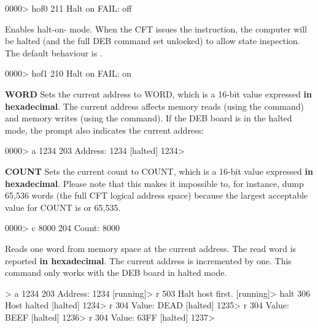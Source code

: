 \begin{description}
\begin{debcode}
[halted] 0000> hof0
211 Halt on FAIL: off
\end{debcode}


\item{\bfseries{}} Enables halt-on- mode. When the CFT
  issues the  instruction, the computer will be halted (and
  the full \gls{DEB} command set unlocked) to allow state
  inspection. The default behaviour is .

\begin{debcode}
[halted] 0000> hof1
210 Halt on FAIL: on
\end{debcode}


\item{\bfseries{} WORD} Sets the current address to WORD, which is a
  16-bit value expressed {\bfseries in hexadecimal}. The current address
  affects memory reads (using the  command) and memory writes
  (using the  command). If the \gls{DEB} board is in the
  halted mode, the prompt also indicates the current address:

\begin{debcode}
[halted] 0000> a 1234
203 Address: 1234
[halted] 1234> 
\end{debcode}


\item{\bfseries{} COUNT} Sets the current count to COUNT, which is a
  16-bit value expressed {\bfseries in hexadecimal}. Please note that this
  makes it impossible to, for instance, dump 65,536 words (the full
  CFT logical address space) because the largest acceptable value for
  COUNT is  or 65,535.

\begin{debcode}
[halted] 0000> c 8000
204 Count: 8000
\end{debcode}


\item{\bfseries{}} Reads one word from memory space at the current
  address. The read word is reported {\bfseries in hexadecimal}. The current
  address is incremented by one. This command only works with the
  \gls{DEB} board in halted mode.

\begin{debcode}
[running]> a 1234
203 Address: 1234
[running]> r
503 Halt host first.
[running]> halt
306 Host halted
[halted] 1234> r
304 Value: DEAD
[halted] 1235> r
304 Value: BEEF
[halted] 1236> r
304 Value: 63FF
[halted] 1237> 
\end{debcode}



\end{description}
